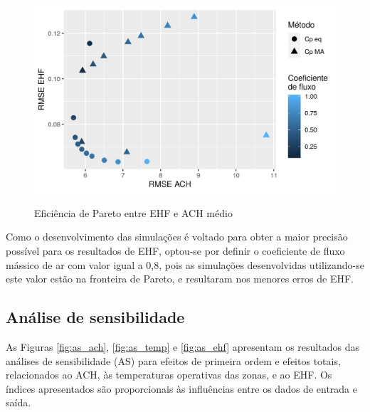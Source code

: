 \documentclass[brazil,hardcopy,openany,a4paper]{ufscthesis}
\begin{document}
	\begin{figure}[H]
		\centering
		\caption{Eficiência de Pareto entre EHF e ACH médio}
		\includegraphics[width=1\linewidth]{img/cpeq_pareto.png}
		\label{fig:pareto}
	\end{figure}
	
	Como o desenvolvimento das simulações é voltado para obter a maior precisão possível para os resultados de EHF, optou-se por definir o coeficiente de fluxo mássico de ar com valor igual a 0,8, pois as simulações desenvolvidas utilizando-se este valor estão na fronteira de Pareto, e resultaram nos menores erros de EHF.
	
	\subsection{Análise de sensibilidade}
	
	As Figuras \ref{fig:as_ach}, \ref{fig:as_temp} e \ref{fig:as_ehf} apresentam os resultados das análises de sensibilidade (AS) para efeitos de primeira ordem e efeitos totais, relacionados ao ACH, às temperaturas operativas das zonas, e ao EHF. Os índices apresentados são proporcionais às influências entre os dados de entrada e saída.
	
\end{document}
